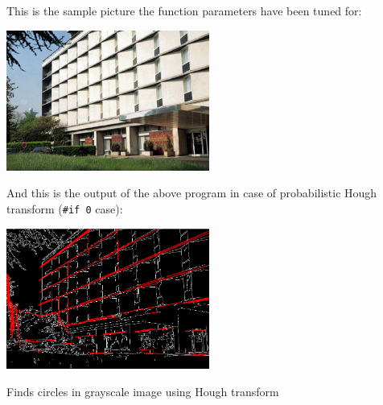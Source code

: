 This is the sample picture the function parameters have been tuned for:

\includegraphics[width=0.5\textwidth]{pics/building.jpg}

And this is the output of the above program in case of probabilistic Hough transform (\texttt{\#if 0} case):

\includegraphics[width=0.5\textwidth]{pics/houghp.png}

\label{HoughCircles}

Finds circles in grayscale image using Hough transform



